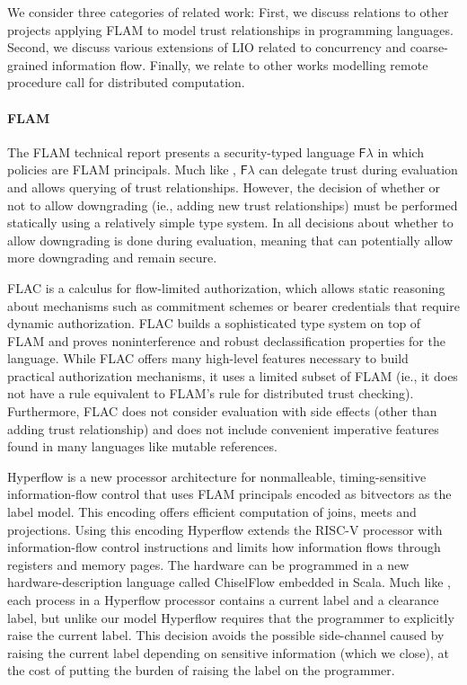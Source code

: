We consider three categories of related work: First, we discuss relations to other projects applying FLAM to model trust relationships in programming languages. Second, we discuss various extensions of LIO related to concurrency and coarse-grained information flow. Finally, we relate \lang{} to other works modelling remote procedure call for distributed computation.

\paragraph{FLAM}
The FLAM technical report \cite{flamtr} presents a security-typed language $\mathsf{F}\lambda$ in which policies are FLAM principals. Much like \lang{}, $\mathsf{F}\lambda$ can delegate trust during evaluation and allows querying of trust relationships. However, the decision of whether or not to allow downgrading (ie., adding new trust relationships) must be performed statically using a relatively simple type system. In \lang{} all decisions about whether to allow downgrading is done during evaluation, meaning that \lang{} can potentially allow more downgrading and remain secure.

FLAC \cite{7536372} is a calculus for flow-limited authorization, which allows static reasoning about mechanisms such as commitment schemes or bearer credentials that require dynamic authorization. FLAC builds a sophisticated type system on top of FLAM and proves noninterference and robust declassification properties for the language. While FLAC offers many high-level features necessary to build practical authorization mechanisms, it uses a limited subset of FLAM (ie., it does not have a rule equivalent to FLAM's  rule for distributed trust checking). Furthermore, FLAC does not consider evaluation with side effects (other than adding trust relationship) and does not include convenient imperative features found in many languages like mutable references.

Hyperflow \cite{hyperflow} is a new processor architecture for nonmalleable, timing-sensitive information-flow control that uses FLAM principals encoded as bitvectors as the label model. This encoding offers efficient computation of joins, meets and projections. Using this encoding Hyperflow extends the RISC-V processor with information-flow control instructions and limits how information flows through registers and memory pages. The hardware can be programmed in a new hardware-description language called ChiselFlow embedded in Scala. Much like \lang{}, each process in a Hyperflow processor contains a current label and a clearance label, but unlike our model Hyperflow requires that the programmer to explicitly raise the current label. This decision avoids the possible side-channel caused by raising the current label depending on sensitive information (which we close), at the cost of putting the burden of raising the label on the programmer.

